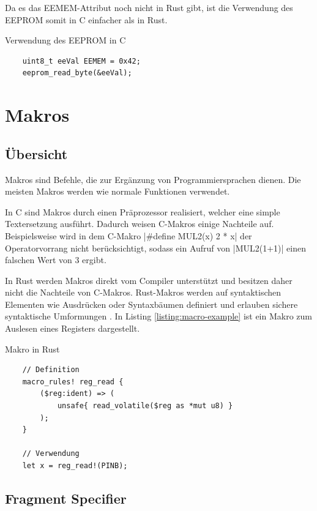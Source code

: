 \documentclass
[ 12pt,
  parskip=half %
]{scrreprt}
\newenvironment{mylisting}[1][H]
{\captionsetup{aboveskip=-0.2\normalbaselineskip}\begin{listing}[#1]}
{\end{listing}}
\begin{document}
Da es das EEMEM-Attribut noch nicht in Rust gibt, ist die Verwendung des EEPROM somit in C einfacher als in Rust.

\begin{mylisting}
	\caption{Verwendung des EEPROM in C}
	\label{listing:eeprom-c}
	\begin{verbatim}
	uint8_t eeVal EEMEM = 0x42;
	eeprom_read_byte(&eeVal);
	\end{verbatim}
\end{mylisting}

\section{Makros}
\label{sec:macros}

\subsection{Übersicht}

Makros sind Befehle, die zur Ergänzung von Programmiersprachen dienen. Die meisten Makros werden wie normale Funktionen verwendet.

In C sind Makros durch einen Präprozessor realisiert, welcher eine simple Textersetzung ausführt. Dadurch weisen C-Makros einige Nachteile auf. Beispielsweise wird in dem C-Makro \cinline|#define MUL2(x) 2 * x| der Operatorvorrang nicht berücksichtigt, sodass ein Aufruf von \cinline|MUL2(1+1)| einen falschen Wert von 3 ergibt. 

In Rust werden Makros direkt vom Compiler unterstützt und besitzen daher nicht die Nachteile von C-Makros. Rust-Makros werden auf syntaktischen Elementen wie Ausdrücken oder Syntaxbäumen definiert und erlauben sichere syntaktische Umformungen \cite{rust-doc-macros}. In Listing \ref{listing:macro-example} ist ein Makro zum Auslesen eines Registers dargestellt.

\begin{mylisting}
	\caption{Makro in Rust}
	\label{listing:macro-example}
	\begin{verbatim}
	// Definition
	macro_rules! reg_read {
		($reg:ident) => (
			unsafe{ read_volatile($reg as *mut u8) }
		);
	}
	
	// Verwendung
	let x = reg_read!(PINB);
	\end{verbatim}
\end{mylisting} 

\subsection{Fragment Specifier}
\end{document}

